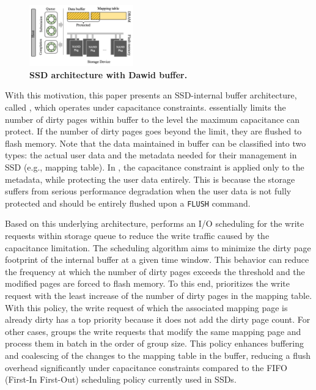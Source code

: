 \begin{figure}[t]
    \centering{}
    \includegraphics[width=0.4\textwidth]{figure/dawid_ssd_archi.png}
    \caption{\textbf{SSD architecture with Dawid buffer.}}
    \label{fig_spartan_archi}
\end{figure}

With this motivation, this paper presents an SSD-internal buffer architecture, called \ours{}, 
which operates under capacitance constraints. 
\ours{} essentially limits the number of dirty pages within buffer
to the level the maximum capacitance can protect.
If the number of dirty pages goes beyond the limit, they are flushed to flash memory. 
Note that the data maintained in buffer can be classified into two types: the actual user data and 
the metadata needed for their management in SSD (e.g., mapping table). 
In \ours{}, the capacitance constraint is applied only to the metadata, while protecting the user data entirely. 
This is because the storage suffers from serious performance degradation when the user data 
is not fully protected and should be entirely flushed upon a \texttt{FLUSH} command.

Based on this underlying architecture, \ours{} performs an I/O scheduling 
for the write requests within storage queue to reduce the write traffic
caused by the capacitance limitation. The scheduling algorithm aims to minimize the dirty page footprint 
of the internal buffer at a given time window. This behavior can reduce the frequency at which the number of dirty pages
exceeds the threshold and the modified pages are forced to flash memory. 
To this end, \ours{} prioritizes the write request with the least increase 
of the number of dirty pages in the mapping table.
With this policy, the write request of which the associated mapping page is already dirty 
has a top priority because it does not add the dirty page count. For other cases,  
\ours{} groups the write requests that modify the same mapping page 
and process them in batch in the order of group size. 
This policy enhances buffering and coalescing of the changes to the mapping table in the buffer, 
reducing a flush overhead significantly under capacitance constraints
compared to the FIFO (First-In First-Out) scheduling policy currently used in SSDs. 

